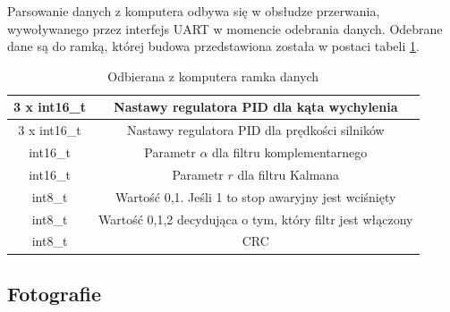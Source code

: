 Parsowanie danych z komputera odbywa się w obsłudze przerwania, wywoływanego przez interfejs UART w momencie odebrania danych. Odebrane dane są do ramką, której budowa przedstawiona została w postaci tabeli \ref{Ramka odebrana}.

\begin{table}[h!]
    \centering
    \caption{Odbierana z komputera ramka danych}
    \begin{tabular}{|c|c|}
        \hline
        3 x int16\_t & Nastawy regulatora PID dla kąta wychylenia \\
        \hline
        3 x int16\_t & Nastawy regulatora PID dla prędkości silników \\
        \hline
        int16\_t & Parametr $\alpha$ dla filtru komplementarnego \\
        \hline
        int16\_t & Parametr $r$ dla filtru Kalmana \\
        \hline
        int8\_t & Wartość 0,1. Jeśli 1 to stop awaryjny jest wciśnięty \\
        \hline
        int8\_t & Wartość 0,1,2 decydująca o tym, który filtr jest włączony \\
        \hline
        int8\_t & CRC \\
        \hline
    \end{tabular}
    \label{Ramka odebrana}
\end{table}

\newpage
\subsection{Fotografie}

